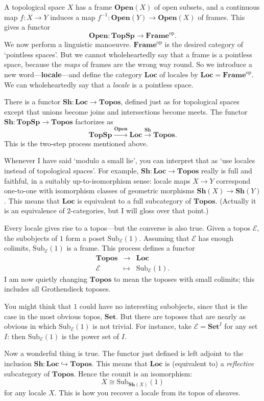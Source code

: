 \documentclass{article}
\newcommand{\cat}[1]{\mathscr{#1}}
\newcommand{\fcat}[1]{\mathbf{#1}}
\newcommand{\op}{\mathrm{op}}
\newcommand{\Set}{\fcat{Set}}
\newcommand{\goesto}{\mapsto}
\newcommand{\demph}[1]{\textbf{\textup{#1}}}
\newcommand{\iso}{\cong}
\newcommand{\E}{\cat{E}}
\newcommand{\Sub}{\mathrm{Sub}}
\newcommand{\toby}[1]{\stackrel{#1}{\to}}
\newcommand{\Sh}{\fcat{Sh}}
\newcommand{\Open}{\fcat{Open}}
\newcommand{\TopSp}{\fcat{TopSp}}
\newcommand{\Topos}{\fcat{Topos}}
\newcommand{\Frame}{\fcat{Frame}}
\newcommand{\Loc}{\fcat{Loc}}
\newcommand{\incl}{\hookrightarrow}
\newcommand{\cln}{\colon}
\begin{document}
A topological space $X$ has a frame $\Open(X)$ of open subsets, and a
continuous map $f\cln X \to Y$ induces a map $f^{-1}\cln \Open(Y) \to
\Open(X)$ of frames.  This gives a functor
\[
\Open\cln \TopSp \to \Frame^\op.
\]
We now perform a linguistic manoeuvre.  $\Frame^\op$ is the desired category
of `pointless spaces'.  But we cannot wholeheartedly say that a frame is a
pointless space, because the \emph{maps} of frames are the wrong way round.
So we introduce a new word---\demph{locale}---and define the category $\Loc$
of locales by $\Loc = \Frame^\op$.  We can wholeheartedly say that a
\emph{locale} is a pointless space.

There is a functor $\Sh\cln \Loc \to \Topos$, defined just as for topological
spaces except that unions become joins and intersections become meets.  The
functor $\Sh\cln \TopSp \to \Topos$ factorizes as
\[
\TopSp \toby{\Open} \Loc \toby{\Sh} \Topos.
\]
This is the two-step process mentioned above.

Whenever I have said `modulo a small lie', you can interpret that as `use
locales instead of topological spaces'.  For example, $\Sh\cln \Loc \to
\Topos$ really is full and faithful, in a suitably up-to-isomorphism sense:
locale maps $X \to Y$ correspond one-to-one with isomorphism classes of
geometric morphisms $\Sh(X) \to \Sh(Y)$.  This means that $\Loc$ is equivalent
to a full subcategory of $\Topos$.  (Actually it is an equivalence of
2-categories, but I will gloss over that point.)

Every locale gives rise to a topos---but the converse is also true.  Given a
topos $\E$, the subobjects of $1$ form a poset $\Sub_\E(1)$.  Assuming that
$\E$ has enough colimits, $\Sub_\E(1)$ is a frame.  This process defines a
functor
\[
\begin{array}{ccc}
\Topos  &\to            &\Loc           \\
\E      &\goesto        &\Sub_\E(1).
\end{array}
\]
I am now quietly changing $\Topos$ to mean the toposes with small colimits;
this includes all Grothendieck toposes.

You might think that $1$ could have no interesting subobjects, since that is
the case in the most obvious topos, $\Set$.  But there are toposes that are
nearly as obvious in which $\Sub_\E(1)$ is not trivial.  For instance, take
$\E = \Set^I$ for any set $I$: then $\Sub_\E(1)$ is the power set of $I$.

Now a wonderful thing is true.  The functor just defined is left adjoint to
the inclusion $\Sh\cln \Loc \incl \Topos$.  This means that $\Loc$ is
(equivalent to) a \emph{reflective} subcategory of $\Topos$.  Hence the counit
is an isomorphism:
\[
X \iso \Sub_{\Sh(X)}(1)
\]
for any locale $X$.  This is how you recover a locale from its topos of
sheaves.
\end{document}
